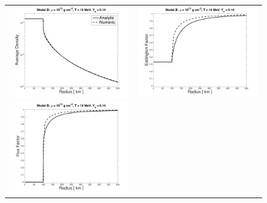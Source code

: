 \documentclass[10pt,preprint]{aastex}
\begin{document}
\begin{figure}
  \begin{center}
    \begin{tabular}{cc}
      \includegraphics[scale=0.4]{./Figures/HomogeneousSphereTable_B_Density} &
      \includegraphics[scale=0.4]{./Figures/HomogeneousSphereTable_B_EddingtonFactor} \\
      \includegraphics[scale=0.4]{./Figures/HomogeneousSphereTable_B_FluxFactor} &

\end{tabular}
\end{center}
\end{figure}
\end{document}
